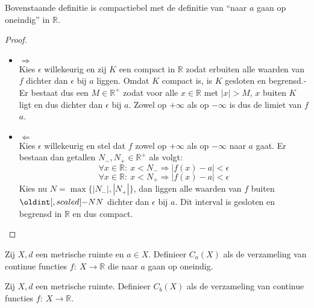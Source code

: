 \documentclass[main.tex]{subfiles}
\begin{document}
\begin{opm}
  Bovenstaande definitie is compactiebel met de definitie van ``naar $a$ gaan op oneindig'' in $\mathbb{R}$.

  \begin{proof}
    \noindent
    \begin{itemize}
    \item $\Rightarrow$\\
      Kies $\epsilon$ willekeurig en zij $K$ een compact in $\mathbb{R}$ zodat erbuiten alle waarden van $f$ dichter dan $\epsilon$ bij $a$ liggen.
      Omdat $K$ compact is, is $K$ gesloten en begrensd.-
      Er bestaat dus een $M\in\mathbb{R}^{+}$ zodat voor alle $x\in \mathbb{R}$ met $|x|>M$, $x$ buiten $K$ ligt en dus dichter dan $\epsilon$ bij $a$.
      Zowel op $+\infty$ als op $-\infty$ is dus de limiet van $f$ $a$.
    \item $\Leftarrow$\\
      Kies $\epsilon$ willekeurig en stel dat $f$ zowel op $+\infty$ als op $-\infty$ naar $a$ gaat.
      Er bestaan dan getallen $N_{-},N_{+}\in\mathbb{R}^{+}$ als volgt:
      \[ \forall x\in \mathbb{R}:\ x < N_{-} \Rightarrow |f(x)-a|< \epsilon \]
      \[ \forall x\in \mathbb{R}:\ x < N_{+}  \Rightarrow |f(x)-a|< \epsilon \]
      Kies nu $N = \max\{|N_{-}|,|N_{+}|\}$, dan liggen alle waarden van $f$ buiten $\interval{-N}{N}$ dichter dan $\epsilon$ bij $a$.
      Dit interval is gesloten en begrensd in $\mathbb{R}$ en dus compact.
    \end{itemize}
  \end{proof}
\end{opm}

\begin{de}
  Zij $X,d$ een metrische ruimte en $a\in X$.
  Definieer $C_{a}(X)$ als de verzameling van continue functies $f:\ X \rightarrow \mathbb{R}$ die naar $a$ gaan op oneindig.
\end{de}

\begin{de}
  Zij $X,d$ een metrische ruimte.
  Definieer $C_{b}(X)$ als de verzameling van continue functies $f:\ X \rightarrow \mathbb{R}$.
\end{de}
\end{document}
